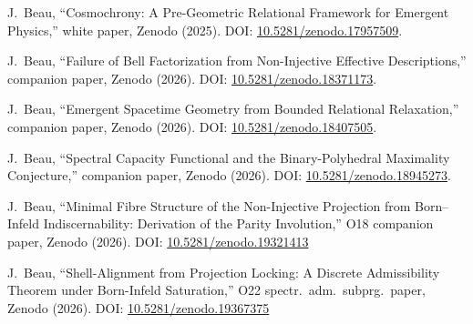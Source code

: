 J.~Beau,
``Cosmochrony: A Pre-Geometric Relational Framework for Emergent Physics,''
white paper, Zenodo (2025).
DOI: \href{https://doi.org/10.5281/zenodo.17957509}{10.5281/zenodo.17957509}.

J.~Beau,
``Failure of Bell Factorization from Non-Injective Effective Descriptions,''
companion paper, Zenodo (2026).
DOI: \href{https://doi.org/10.5281/zenodo.18371173}{10.5281/zenodo.18371173}.

J.~Beau,
``Emergent Spacetime Geometry from Bounded Relational Relaxation,''
companion paper, Zenodo (2026).
DOI: \href{https://doi.org/10.5281/zenodo.18407505}{10.5281/zenodo.18407505}.

J.~Beau,
``Spectral Capacity Functional and the Binary-Polyhedral Maximality Conjecture,''
companion paper, Zenodo (2026).
DOI: \href{https://doi.org/10.5281/zenodo.18945273}{10.5281/zenodo.18945273}.

J.~Beau,
``Minimal Fibre Structure of the Non-Injective Projection from Born--Infeld Indiscernability:
Derivation of the Parity Involution,''
O18 companion paper, Zenodo (2026).
DOI: \href{https://doi.org/10.5281/zenodo.19321413}{10.5281/zenodo.19321413}

J.~Beau,
``Shell-Alignment from Projection Locking: A Discrete Admissibility Theorem under Born-Infeld Saturation,''
O22 spectr.\ adm.\ subprg.\ paper, Zenodo (2026).
DOI: \href{https://doi.org/10.5281/zenodo.19367375}{10.5281/zenodo.19367375}

